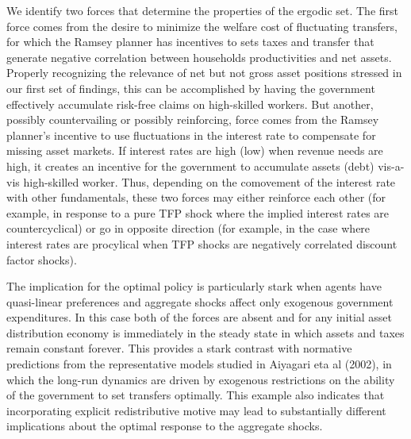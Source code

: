 \documentclass[thmsb,11pt]{article}
\begin{document}
We identify two forces that determine the properties of the ergodic set. The first force comes from the desire to minimize the welfare cost of fluctuating transfers, for which the Ramsey planner has incentives to sets taxes and transfer that generate negative correlation between households productivities and net assets. Properly recognizing the relevance  of net but not gross asset positions stressed in
our first set of findings, this  can be accomplished by having the  government  effectively accumulate risk-free claims on high-skilled workers.
But another, possibly countervailing or possibly reinforcing,  force  comes from the Ramsey planner's incentive to  use fluctuations in the  interest rate to compensate for missing asset markets. If interest rates are high (low) when revenue needs are high, it creates an incentive  for the government to accumulate assets (debt) vis-a-vis high-skilled worker. Thus, depending on the comovement of the interest rate with other fundamentals, these two forces  may either reinforce each other (for example, in response to  a pure TFP shock where the implied interest rates are countercyclical) or go in  opposite direction (for example, in the case where interest rates are procylical when TFP shocks are negatively correlated discount factor shocks).

The implication for the optimal policy is particularly stark when agents have quasi-linear preferences and aggregate shocks affect only exogenous government expenditures. In this case both of the forces are absent and for any initial asset distribution economy is immediately in the steady state in which assets and taxes remain constant forever. This provides a stark contrast with normative predictions from the representative models studied in Aiyagari eta al (2002), in which the long-run dynamics are driven by exogenous restrictions on the ability of the government to set transfers optimally. This example also indicates that incorporating explicit redistributive motive may lead to substantially different implications about the optimal response to the aggregate shocks.
\end{document}
